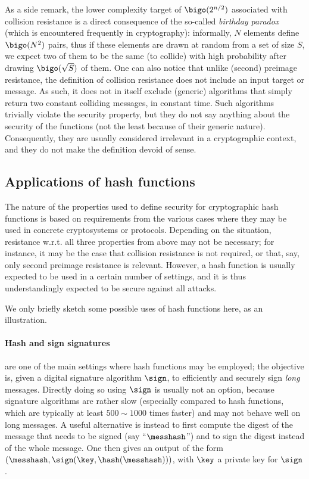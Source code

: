 As a side remark, the lower complexity target of $\bigo(2^{n/2})$ associated with collision resistance is a direct consequence of the so-called \emph{birthday paradox} (which
is encountered frequently in cryptography): informally,
$N$ elements define $\bigo(N^2)$ pairs, thus if these elements are drawn at random from a set of size $S$, we expect two of them to be the same (\ie to collide)
with high probability after drawing $\bigo(\sqrt{S})$ of them.
One can also notice that unlike (second) preimage resistance, the definition of collision resistance does not include an input target or message. As such, it does not in itself
exclude (generic) algorithms that simply return two constant colliding messages, in constant time. Such algorithms trivially violate the security property, but
they do not say anything about the security of the functions (not the least because of their generic nature). Consequently, they are usually considered irrelevant in a cryptographic context, and they do not make
the definition devoid of sense.

\subsection{Applications of hash functions}

The nature of the properties used to define security for cryptographic hash functions is based on requirements from the various cases where they may be used in concrete cryptosystems or protocols.
Depending on the situation, resistance w.r.t. all three properties from above may not be necessary; for instance, it may be the case that collision resistance is not required, or that, say, only second preimage resistance
is relevant. However, a hash function is usually expected to be used in a certain number of settings, and it is thus understandingly expected to be secure against all attacks.

We only briefly sketch some possible uses of hash functions here, as an illustration.

\paragraph{Hash and sign signatures} are one of the main settings where hash functions may be employed; the objective is, given a digital signature
algorithm $\sign$, to efficiently and securely sign \emph{long} messages. Directly doing so using $\sign$ is usually not an option, because signature algorithms are rather slow (especially compared
to hash functions, which are typically at least $500 \sim 1000$ times faster) and may not behave well on long messages. A useful alternative is instead to first compute the digest of the
message that needs to be signed (say ``$\messhash$'') and to sign the digest instead of the whole message. One then gives an output of the form $(\messhash, \sign(\key,\hash(\messhash)))$, with $\key$ a private key for $\sign$. 

